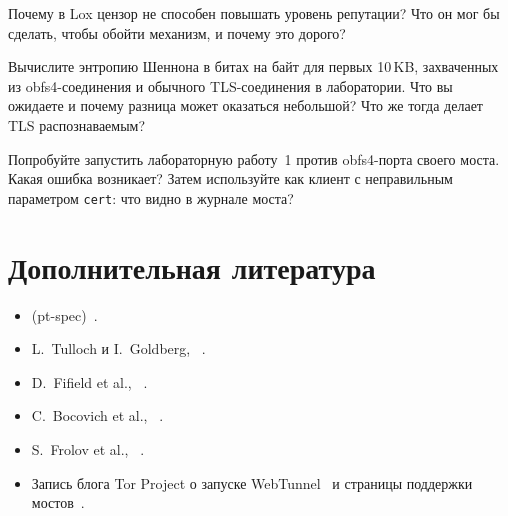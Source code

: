 \begin{esercizio}[2]\label{es:16-lox}
Почему в Lox цензор не способен повышать уровень репутации? Что он мог бы сделать, чтобы обойти механизм, и почему это дорого?
\end{esercizio}

\begin{esercizio}[2]\label{es:16-entropia}
Вычислите энтропию Шеннона в битах на байт для первых 10\,KB, захваченных из obfs4-соединения и обычного TLS-соединения в лаборатории. Что вы ожидаете и почему разница может оказаться небольшой? Что же тогда делает TLS распознаваемым?
\end{esercizio}

\begin{esercizio}[3]\label{es:16-sondaggio-lab}
Попробуйте запустить лабораторную работу~1 против obfs4-порта своего моста. Какая ошибка возникает? Затем используйте  как клиент с неправильным параметром \texttt{cert}: что видно в журнале моста?
\end{esercizio}

\section*{Дополнительная литература}
\begin{itemize}
  \item {} (pt-spec)~\cite{torspec}.
  \item L.~Tulloch и I.~Goldberg, ~\cite{tulloch2023lox}.
  \item D.~Fifield et al., ~\cite{fifield2015fronting}.
  \item C.~Bocovich et al., ~\cite{bocovich2024snowflake}.
  \item S.~Frolov et al., ~\cite{frolov2019conjure}.
  \item Запись блога Tor Project о запуске WebTunnel~\cite{torblogwebtunnel} и страницы поддержки мостов~\cite{torsupport}.
\end{itemize}
